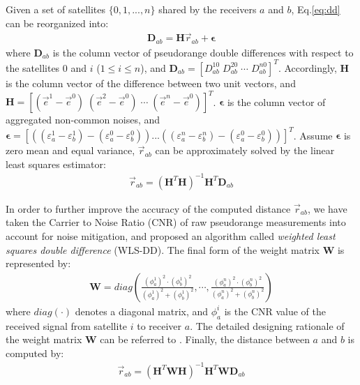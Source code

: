 \documentclass[letterpaper, 10 pt, conference]{ieeeconf}
\begin{document}
Given a set of satellites $\{ 0,1,...,n\}$ shared by the receivers $a$ and $b$, Eq.\ref{eq:dd}  can be reorganized into:
\begin{eqnarray}
\mathbf{D}_{ab}= \mathbf{H} \vec{r}_{ab} + \boldsymbol{\epsilon}
\label{eq:dd_vec}
\end{eqnarray}
where $\mathbf{D}_{ab}$ is the column vector of pseudorange double differences with respect to the satellites $0$ and $i$ ($1 \le i \le n$), and $\mathbf{D}_{ab}=[D^{10}_{ab} \; D^{20}_{ab} \; \cdots \; D^{n0}_{ab}]^T$. Accordingly, $\mathbf{H}$ is the column vector of the difference between two unit vectors, and $\mathbf{H} = [(\vec{e}^1 - \vec{e}^0) \; (\vec{e}^2 - \vec{e}^0) \; \cdots \; (\vec{e}^n - \vec{e}^0)]^T$.  $\boldsymbol{\epsilon}$ is the column vector of aggregated non-common noises, and  $\boldsymbol{\epsilon} = [\left( {(\varepsilon _a^1  - \varepsilon _b^1 ) - (\varepsilon _a^0  - \varepsilon _b^0 )} \right)...\left( {(\varepsilon _a^n  - \varepsilon _b^n ) - (\varepsilon _a^0  - \varepsilon _b^0 )} \right)]^T$. Assume $\boldsymbol{\epsilon}$ is zero mean and equal variance, $\vec{r}_{ab}$ can be approximately solved by the linear least squares estimator:
\begin{eqnarray}
\vec{r}_{ab}= (\mathbf{H}^T \mathbf{H})^{-1}  \mathbf{H}^T  \mathbf{D}_{ab}
\end{eqnarray}

In order to further improve the accuracy of the computed distance $\vec{r}_{ab}$, we have taken the Carrier to Noise Ratio (CNR) of raw pseudorange measurements into account for noise mitigation, and proposed an algorithm called  \emph{weighted least squares double difference }(WLS-DD). The final form of the weight matrix $\mathbf{W}$ is represented by:
\begin{eqnarray}
\mathbf{W} = diag\left(\frac{(\phi^1_a)^2 \cdot (\phi^1_b)^2}{(\phi^1_a)^2 + (\phi^1_b)^2}, \cdots, \frac{(\phi^n_a)^2 \cdot (\phi^n_b)^2}{(\phi^n_a)^2 + (\phi^n_b)^2}\right)
\end{eqnarray}
where $diag(\cdot)$  denotes a diagonal matrix, and $\phi^i_a$ is the CNR value of the received signal from  satellite $i$ to receiver $a$. The detailed designing rationale of the weight matrix $\mathbf{W}$ can be referred to \cite{yang2012vehicle}. Finally, the distance between $a$  and $b$ is computed by:
\begin{eqnarray}
\vec{r}_{ab}= (\mathbf{H}^T \mathbf{W} \mathbf{H})^{-1}  \mathbf{H}^T \mathbf{W} \mathbf{D}_{ab}
\label{eq:wls}
\end{eqnarray}
\end{document}
